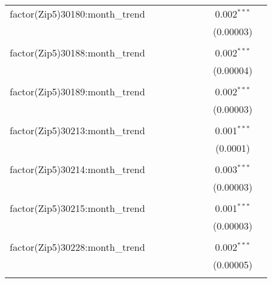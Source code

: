 \begin{table}[H]
{\begin{tabular}{@{\extracolsep{5pt}}lcccccccc}
  factor(Zip5)30180:month\_trend &  &  &  &  &  &  & 0.002$^{***}$ &  \\  

   &  &  &  &  &  &  & (0.00003) &  \\  

   & & & & & & & & \\  

  factor(Zip5)30188:month\_trend &  &  &  &  &  &  & 0.002$^{***}$ &  \\  

   &  &  &  &  &  &  & (0.00004) &  \\  

   & & & & & & & & \\  

  factor(Zip5)30189:month\_trend &  &  &  &  &  &  & 0.002$^{***}$ &  \\  

   &  &  &  &  &  &  & (0.00003) &  \\  

   & & & & & & & & \\  

  factor(Zip5)30213:month\_trend &  &  &  &  &  &  & 0.001$^{***}$ &  \\  

   &  &  &  &  &  &  & (0.0001) &  \\  

   & & & & & & & & \\  

  factor(Zip5)30214:month\_trend &  &  &  &  &  &  & 0.003$^{***}$ &  \\  

   &  &  &  &  &  &  & (0.00003) &  \\  

   & & & & & & & & \\  

  factor(Zip5)30215:month\_trend &  &  &  &  &  &  & 0.001$^{***}$ &  \\  

   &  &  &  &  &  &  & (0.00003) &  \\  

   & & & & & & & & \\  

  factor(Zip5)30228:month\_trend &  &  &  &  &  &  & 0.002$^{***}$ &  \\  

   &  &  &  &  &  &  & (0.00005) &  \\  

   & & & & & & & & \\  


\end{tabular}}
\end{table}
